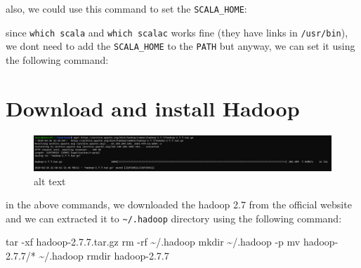 \documentclass[
]{article}
\newenvironment{Shaded}{}{}
\newcommand{\BuiltInTok}[1]{#1}
\newcommand{\FunctionTok}[1]{\textcolor[rgb]{0.02,0.16,0.49}{#1}}
\newcommand{\KeywordTok}[1]{\textcolor[rgb]{0.00,0.44,0.13}{\textbf{#1}}}
\newcommand{\NormalTok}[1]{#1}
\newcommand{\StringTok}[1]{\textcolor[rgb]{0.25,0.44,0.63}{#1}}
\newcommand{\VariableTok}[1]{\textcolor[rgb]{0.10,0.09,0.49}{#1}}
\begin{document}
also, we could use this command to set the \texttt{SCALA\_HOME}:

\begin{Shaded}
\end{Shaded}

since \texttt{which\ scala} and \texttt{which\ scalac} works fine (they
have links in \texttt{/usr/bin}), we dont need to add the
\texttt{SCALA\_HOME} to the \texttt{PATH} but anyway, we can set it
using the following command:

\begin{Shaded}
\end{Shaded}

\hypertarget{download-and-install-hadoop}{%
\section{Download and install
Hadoop}\label{download-and-install-hadoop}}

\begin{figure}
\centering
\includegraphics{image-2.png}
\caption{alt text}
\end{figure}

in the above commands, we downloaded the hadoop 2.7 from the official
website and we can extracted it to \texttt{\textasciitilde{}/.hadoop}
directory using the following command:

\begin{Shaded}
\begin{Highlighting}[]
\FunctionTok{tar}\NormalTok{ {-}xf hadoop{-}2.7.7.tar.gz}
\FunctionTok{rm}\NormalTok{ {-}rf \textasciitilde{}/.hadoop}
\FunctionTok{mkdir}\NormalTok{ \textasciitilde{}/.hadoop {-}p}
\FunctionTok{mv}\NormalTok{ hadoop{-}2.7.7/* \textasciitilde{}/.hadoop}
\FunctionTok{rmdir}\NormalTok{ hadoop{-}2.7.7}
\end{Highlighting}
\end{Shaded}
\end{document}
